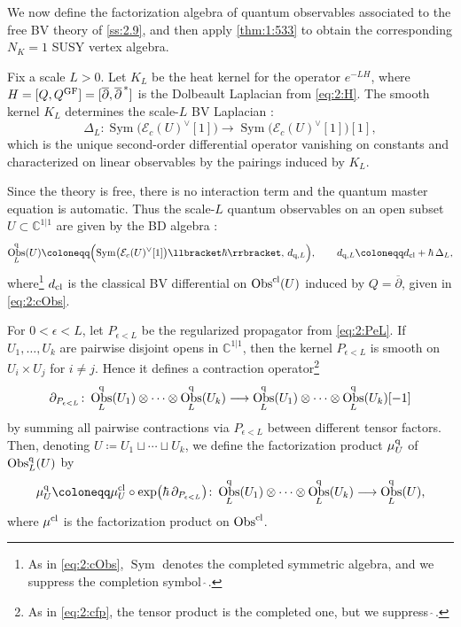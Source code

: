 \documentclass[final,reqno]{amsart}
\numberwithin{equation}{section}
\theoremstyle{definition}
\newcommand{\ep}{\epsilon}
\newcommand{\wh}{\widehat}
\newcommand{\ceq}{\coloneqq} %
\newcommand{\lto}{\longrightarrow}
\newcommand{\q}{\textup{q}}
\newcommand{\GF}{\textup{GF}}
\newcommand{\tcl}{\textup{cl}}
\newcommand{\bbC}{\mathbb{C}}
\newcommand{\sC}{\mathbb{C}^{1|1}}
\newcommand{\clE}{\mathcal{E}}
\newcommand{\pd}{\partial}
\newcommand{\bpd}{\overline{\partial}}
\newcommand{\dbr}[1]{\llbracket #1 \rrbracket} %
\newcommand{\cObs}[1]{\mathop{\Obs^{\textup{cl}}_{#1}}}
\newcommand{\qObs}[1]{\mathop{\Obs^{\textup{q}}_{#1}}}
\DeclareMathOperator{\Sym}{Sym}
\DeclareMathOperator{\Obs}{Obs}
\begin{document}
We now define the factorization algebra of quantum observables associated to 
the free BV theory of \cref{ss:2.9}, and then apply \cref{thm:1:533}
to obtain the corresponding $N_K=1$ SUSY vertex algebra.

Fix a scale $L>0$. 
Let $K_L$ be the heat kernel for the operator $e^{-LH}$, where
$H = [Q,Q^{\GF} ] =[\bpd,\bpd^{\,*}]$
is the Dolbeault Laplacian from \eqref{eq:2:H}. 
The smooth kernel $K_L$ determines the scale-$L$ BV Laplacian \cite[\S8.2]{CG2}: 
\[
 \Delta_L\colon \Sym\bigl(\clE_c(U)^\vee[1]\bigr) \lto
 \Sym\bigl(\clE_c(U)^\vee[1]\bigr)[1],
\]
which is the unique second-order differential operator vanishing on constants
and characterized on linear observables by the pairings induced by $K_L$.

Since the theory is free, there is no interaction term and 
the quantum master equation is automatic. 
Thus the scale-$L$ quantum observables on an open subset 
$U \subset \bbC^{1|1}$ are given by the BD algebra \cite[\S8.2]{CG2}: 
\begin{align}\label{eq:2:qObsL}
 \qObs{L}(U) \ceq 
 \Bigl(\Sym\bigl(\clE_c(U)^\vee[1]\bigr)\dbr{\hbar}, \, d_{\q,L}\Bigr),
 \qquad
 d_{\q,L} \ceq d_{\tcl}+\hbar\,\Delta_L,
\end{align}
where\footnote{As in \eqref{eq:2:cObs}, $\Sym$ denotes the completed 
symmetric algebra, and we suppress the completion symbol $\wh{\ }$.}
$d_{\tcl}$ is the classical BV differential on $\cObs{}(U)$ 
induced by $Q=\bpd$, given in \eqref{eq:2:cObs}.

For $0<\ep<L$, let $P_{\ep<L}$ be 
the regularized propagator from \eqref{eq:2:PeL}. 
If $U_1,\dotsc,U_k$ are pairwise disjoint opens in $\sC$, 
then the kernel $P_{\ep<L}$ is smooth on $U_i \times U_j$ for $i \ne j$. 
Hence it defines a contraction operator\footnote{As in \eqref{eq:2:cfp}, 
 the tensor product is the completed one, but we suppress $\wh{\ }$.}
\[
 \pd_{P_{\ep<L}}\colon 
 \qObs{L}(U_1) \otimes\dotsb\otimes \qObs{L}(U_k) \lto
 \qObs{L}(U_1) \otimes\dotsb\otimes \qObs{L}(U_k)[-1]
\]
by summing all pairwise contractions via $P_{\ep<L}$ 
between different tensor factors. 
Then, denoting $U \ceq U_1 \sqcup \cdots \sqcup U_k$,
we define the factorization product $\mu^{\q}_U$ of $\qObs{L}(U)$ by
\begin{align}\label{eq:2:qfm}
 \mu^{\q}_U \ceq \mu^{\tcl}_U \circ
 \exp\bigl(\hbar\,\pd_{P_{\ep<L}}\bigr)\colon 
 \qObs{L}(U_1) \otimes \dotsb \otimes \qObs{L}(U_k) \lto \qObs{L}(U),
\end{align}
where $\mu^{\tcl}$ is the factorization product on $\cObs{}$. 
\end{document}

